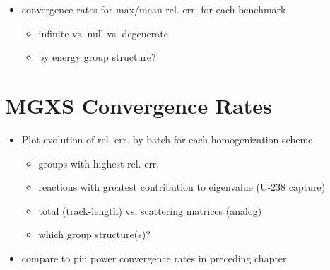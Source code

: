 \begin{itemize}[noitemsep]
  \item convergence rates for max/mean rel. err. for each benchmark
  \begin{itemize}[noitemsep]
    \item infinite vs. null vs. degenerate
    \item by energy group structure?
  \end{itemize}
\end{itemize}


\section{MGXS Convergence Rates}
\label{sec:chap8-mgxs-converge}

\begin{itemize}[noitemsep]
  \item Plot evolution of rel. err. by batch for each homogenization scheme
  \begin{itemize}[noitemsep]
    \item groups with highest rel. err.
    \item reactions with greatest contribution to eigenvalue (U-238 capture)
    \item total (track-length) vs. scattering matrices (analog)    
    \item which group structure(s)?
 \end{itemize}
  \item compare to pin power convergence rates in preceding chapter
\end{itemize}


